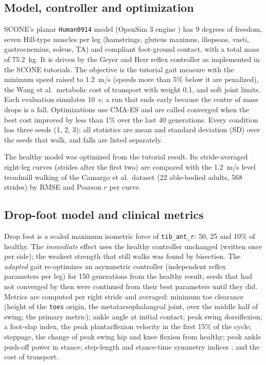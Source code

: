\subsection{Model, controller and optimization}
SCONE's planar \texttt{Human0914} model (OpenSim 3 engine \cite{delp2007}) has 9 degrees of freedom, seven Hill-type muscles per leg (hamstrings, gluteus maximus, iliopsoas, vasti, gastrocnemius, soleus, TA) and compliant foot-ground contact, with a total mass of \SI{75.2}{kg}. It is driven by the Geyer and Herr reflex controller \cite{geyer2010} as implemented in the SCONE tutorials. The objective is the tutorial gait measure with the minimum speed raised to \SI{1.2}{m/s} (speeds more than 5\% below it are penalized), the Wang et al.\ metabolic cost of transport \cite{wang2012} with weight 0.1, and soft joint limits. Each evaluation simulates \SI{10}{s}; a run that ends early because the centre of mass drops is a fall. Optimizations use CMA-ES \cite{hansen2016} and are called converged when the best cost improved by less than 1\% over the last 40 generations. Every condition has three seeds (1, 2, 3); all statistics are mean and standard deviation (SD) over the seeds that walk, and falls are listed separately.

The healthy model was optimized from the tutorial result. Its stride-averaged right-leg curves (strides after the first two) are compared with the 1.2~m/s level treadmill walking of the Camargo et al.\ dataset \cite{camargo2021} (22 able-bodied adults, 568 strides) by RMSE and Pearson $r$ per curve.

\subsection{Drop-foot model and clinical metrics}
Drop foot is a scaled maximum isometric force of \texttt{tib\_ant\_r}: 50, 25 and 10\% of healthy. The \emph{immediate} effect uses the healthy controller unchanged (written once per side); the weakest strength that still walks was found by bisection. The \emph{adapted} gait re-optimizes an asymmetric controller (independent reflex parameters per leg) for 150 generations from the healthy result; seeds that had not converged by then were continued from their best parameters until they did. Metrics are computed per right stride and averaged:
minimum toe clearance (height of the \texttt{toes} origin, the metatarsophalangeal joint, over the middle half of swing; the primary metric);
ankle angle at initial contact;
peak swing dorsiflexion;
a foot-slap index, the peak plantarflexion velocity in the first 15\% of the cycle;
steppage, the change of peak swing hip and knee flexion from healthy;
peak ankle push-off power in stance;
step-length and stance-time symmetry indices \cite{robinson1987};
and the cost of transport.

